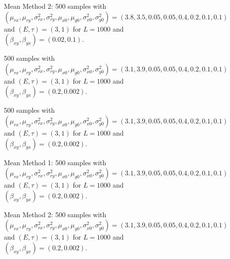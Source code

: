 \documentclass[a4paper,11pt]{article}
\begin{document}
\begin{figure}[h!t]
\begin{subfigure}[b]{0.4\textwidth}
\caption{Mean Method 2: 500 samples with $\left(\mu_{rx},\mu_{ry},\sigma^2_{rx},\sigma^2_{ry},\mu_{x0},\mu_{y0},\sigma^2_{x0},\sigma^2_{y0}\right) = \left(3.8,3.5,0.05,0.05,0.4,0.2,0.1,0.1\right)$ and $\left(E,\tau\right)=\left(3,1\right)$ for $L=1000$ and $(\beta_{xy},\beta_{yx})=(0.02,0.1)$.}
\end{subfigure}
\caption{}
\end{figure}

\begin{figure}[h!t]
\centering
\begin{subfigure}[b]{0.4\textwidth}
\label{fig:SugEx2wCCMpoints_scatterhist}
\caption{500 samples with $\left(\mu_{rx},\mu_{ry},\sigma^2_{rx},\sigma^2_{ry},\mu_{x0},\mu_{y0},\sigma^2_{x0},\sigma^2_{y0}\right) = \left(3.1,3.9,0.05,0.05,0.4,0.2,0.1,0.1\right)$ and $\left(E,\tau\right)=\left(3,1\right)$ for $L=1000$ and $(\beta_{xy},\beta_{yx})=(0.2,0.002)$.}
\end{subfigure}
\begin{subfigure}[b]{0.4\textwidth}
\label{fig:SugEx2wCCMpoints_densityhist}
\caption{500 samples with $\left(\mu_{rx},\mu_{ry},\sigma^2_{rx},\sigma^2_{ry},\mu_{x0},\mu_{y0},\sigma^2_{x0},\sigma^2_{y0}\right) = \left(3.1,3.9,0.05,0.05,0.4,0.2,0.1,0.1\right)$ and $\left(E,\tau\right)=\left(3,1\right)$ for $L=1000$ and $(\beta_{xy},\beta_{yx})=(0.2,0.002)$.}
\end{subfigure}
\caption{}
\end{figure}
\begin{figure}[h!t]
\centering
\begin{subfigure}[b]{0.4\textwidth}
\label{fig:SugEx2DCORR_mean1}
\caption{Mean Method 1: 500 samples with $\left(\mu_{rx},\mu_{ry},\sigma^2_{rx},\sigma^2_{ry},\mu_{x0},\mu_{y0},\sigma^2_{x0},\sigma^2_{y0}\right) = \left(3.1,3.9,0.05,0.05,0.4,0.2,0.1,0.1\right)$ and $\left(E,\tau\right)=\left(3,1\right)$ for $L=1000$ and $(\beta_{xy},\beta_{yx})=(0.2,0.002)$.}
\end{subfigure}
\begin{subfigure}[b]{0.4\textwidth}
\label{fig:SugEx2DCORR_mean2}
\caption{Mean Method 2: 500 samples with $\left(\mu_{rx},\mu_{ry},\sigma^2_{rx},\sigma^2_{ry},\mu_{x0},\mu_{y0},\sigma^2_{x0},\sigma^2_{y0}\right) = \left(3.1,3.9,0.05,0.05,0.4,0.2,0.1,0.1\right)$ and $\left(E,\tau\right)=\left(3,1\right)$ for $L=1000$ and $(\beta_{xy},\beta_{yx})=(0.2,0.002)$.}
\end{subfigure}
\caption{}
\end{figure}
\end{document}
